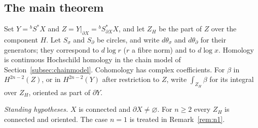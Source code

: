 \documentclass[11pt,oneside,reqno]{article}
\newcommand{\Sbstar}{{}^{b}S^*X}
\theoremstyle{plain}
\theoremstyle{definition}
\theoremstyle{remark}
\begin{document}
\subsection{The main theorem}\label{subsec:mainthm}
Set \(Y=\Sbstar\) and \(Z=Y|_{\partial X}={}^bS^*_{\partial X}X\), and let
\(Z_H\) be the part of \(Z\) over the component \(H\). Let \(S_\sigma\) and
\(S_\partial\) be circles, and write \(d\theta_\sigma\) and
\(d\theta_\partial\) for their generators; they correspond to \(d\log r\)
(\(r\) a fibre norm) and to \(d\log x\). Homology is continuous Hochschild
homology in the chain model of Section~\ref{subsec:chainmodel}.
Cohomology has complex coefficients. For \(\beta\) in \(H^{2n-2}(Z)\), or
in \(H^{2n-2}(Y)\) after restriction to \(Z\), write
\(\int_{Z_H}\beta\) for its integral over \(Z_H\), oriented as part of
\(\partial Y\).

\emph{Standing hypotheses.} \(X\) is connected and \(\partial X\neq
\varnothing\). For \(n\geq2\) every \(Z_H\) is connected and oriented. The
case \(n=1\) is treated in Remark~\ref{rem:n1}.
\end{document}
